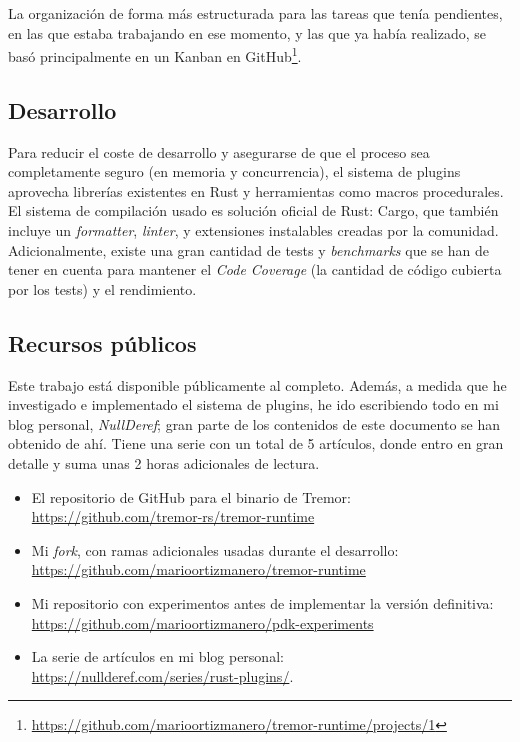 La organización de forma más estructurada para las tareas que tenía pendientes,
en las que estaba trabajando en ese momento, y las que ya había realizado, se
basó principalmente en un Kanban en
GitHub\footnote{\url{https://github.com/marioortizmanero/tremor-runtime/projects/1}}.

\subsection{Desarrollo}

Para reducir el coste de desarrollo y asegurarse de que el proceso sea
completamente seguro (en memoria y concurrencia), el sistema de plugins
aprovecha librerías existentes en Rust y herramientas como macros procedurales.
El sistema de compilación usado es solución oficial de Rust: Cargo, que también
incluye un \emph{formatter}, \emph{linter}, y extensiones instalables creadas
por la comunidad. Adicionalmente, existe una gran cantidad de tests y
\emph{benchmarks} que se han de tener en cuenta para mantener el \emph{Code
Coverage} (la cantidad de código cubierta por los tests) y el rendimiento.

\subsection{Recursos públicos}

Este trabajo está disponible públicamente al completo. Además, a medida que he
investigado e implementado el sistema de plugins, he ido escribiendo todo en mi
blog personal, \emph{NullDeref}; gran parte de los contenidos de este documento
se han obtenido de ahí. Tiene una serie con un total de 5 artículos, donde entro
en gran detalle y suma unas 2 horas adicionales de lectura.

\begin{itemize}
    \item El repositorio de GitHub para el binario de Tremor:\\
        \url{https://github.com/tremor-rs/tremor-runtime}
    \item Mi \emph{fork}, con ramas adicionales usadas durante el desarrollo:\\
        \url{https://github.com/marioortizmanero/tremor-runtime}
    \item Mi repositorio con experimentos antes de implementar la versión
        definitiva:\\
        \url{https://github.com/marioortizmanero/pdk-experiments}
    \item La serie de artículos en mi blog personal:\\
        \url{https://nullderef.com/series/rust-plugins/}.
\end{itemize}


